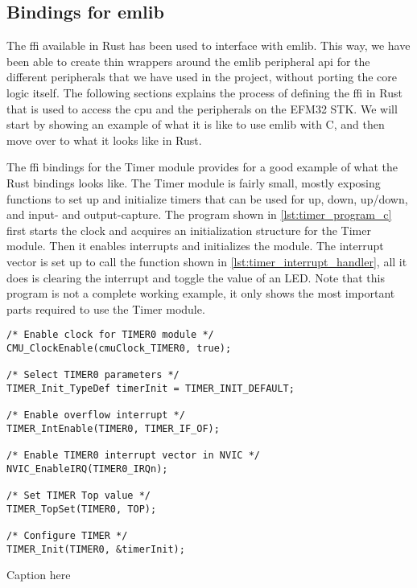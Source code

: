 
\subsection{Bindings for emlib} %
\label{sub:interfacing_with_emlib}

The \gls{ffi} available in Rust has been used to interface with emlib. This way, we have been able
to create thin wrappers around the emlib peripheral \gls{api} for the different peripherals that we
have used in the project, without porting the core logic itself. The following sections explains the
process of defining the \gls{ffi} in Rust that is used to access the \gls{cpu} and the peripherals
on the EFM32 STK. We will start by showing an example of what it is like to use emlib with C, and
then move over to what it looks like in Rust.

The \gls{ffi} bindings for the Timer module \cite{an0014_timer} provides for a good example of what
the Rust bindings looks like. The Timer module is fairly small, mostly exposing functions to set up
and initialize timers that can be used for up, down, up/down, and input- and output-capture. The
program shown in \autoref{lst:timer_program_c} first starts the clock and acquires an initialization
structure for the Timer module. Then it enables interrupts and initializes the module. The interrupt
vector is set up to call the function shown in \autoref{lst:timer_interrupt_handler}, all it does is
clearing the interrupt and toggle the value of an LED. Note that this program is not a complete working
example, it only shows the most important parts required to use the Timer module.

\begin{listing}[tb]
\begin{verbatim}
/* Enable clock for TIMER0 module */
CMU_ClockEnable(cmuClock_TIMER0, true);

/* Select TIMER0 parameters */
TIMER_Init_TypeDef timerInit = TIMER_INIT_DEFAULT;

/* Enable overflow interrupt */
TIMER_IntEnable(TIMER0, TIMER_IF_OF);

/* Enable TIMER0 interrupt vector in NVIC */
NVIC_EnableIRQ(TIMER0_IRQn);

/* Set TIMER Top value */
TIMER_TopSet(TIMER0, TOP);

/* Configure TIMER */
TIMER_Init(TIMER0, &timerInit);
\end{verbatim}
\caption{Caption here}
\label{lst:timer_program_c}
\end{listing}

